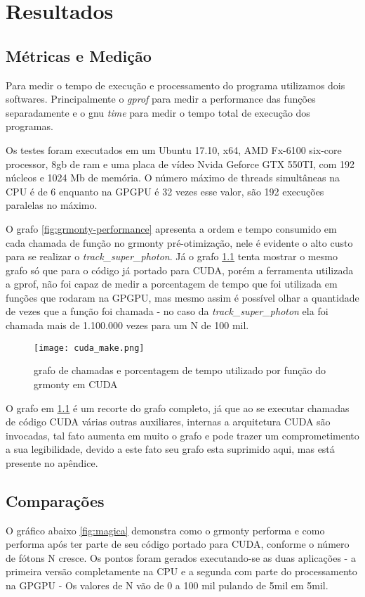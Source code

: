 \chapter{Resultados}
\label{cap:resultados}

\section{Métricas e Medição}
  Para medir o tempo  de execução e processamento  do programa utilizamos dois softwares. Principalmente o \textit{gprof} para medir a performance das funções separadamente e o gnu \textit{time} para medir o tempo total de execução dos programas.

  Os testes foram executados em um Ubuntu 17.10, x64, AMD Fx-6100 six-core processor, 8gb de ram e uma placa de vídeo Nvida Geforce GTX 550TI, com 192 núcleos e 1024 Mb de memória. O número máximo de threads simultâneas na CPU é de 6 enquanto na GPGPU é 32 vezes esse valor, são 192 execuções paralelas no máximo.

  O grafo \ref{fig:grmonty-performance} apresenta a ordem e tempo consumido em cada chamada de função no grmonty pré-otimização, nele é evidente o alto custo para se realizar o  \textit{track\_super\_photon}. Já o grafo \ref{fig:cudamake} tenta mostrar o mesmo grafo só que para o código já portado para CUDA, porém a ferramenta utilizada a gprof, não foi capaz de medir a porcentagem de tempo que foi utilizada em funções que rodaram na GPGPU, mas mesmo assim é possível olhar a quantidade de vezes que a função foi chamada - no caso da  \textit{track\_super\_photon} ela foi chamada mais de 1.100.000 vezes para um N de 100 mil.

  \begin{figure}[!h]
    \centering
    \texttt{[image: cuda\_make.png]}
    \caption{grafo de chamadas e porcentagem de tempo utilizado por função do grmonty em CUDA}
    \label{fig:cudamake}
  \end{figure}

  O grafo em \ref{fig:cudamake} é um recorte do grafo completo, já que ao se executar chamadas de código CUDA várias outras auxiliares, internas a arquitetura CUDA são invocadas, tal fato aumenta em muito o grafo e pode trazer um comprometimento a sua legibilidade, devido a este fato seu grafo esta suprimido aqui, mas está presente no apêndice.

\section{Comparações}
  O gráfico abaixo \ref{fig:magica} demonstra como o grmonty performa e como performa após ter parte de seu código portado para CUDA, conforme o número de fótons N cresce. Os pontos foram gerados executando-se as duas aplicações -  a primeira versão completamente na CPU e a segunda com parte do processamento na GPGPU - Os valores de N vão de 0 a 100 mil pulando de 5mil em 5mil.

